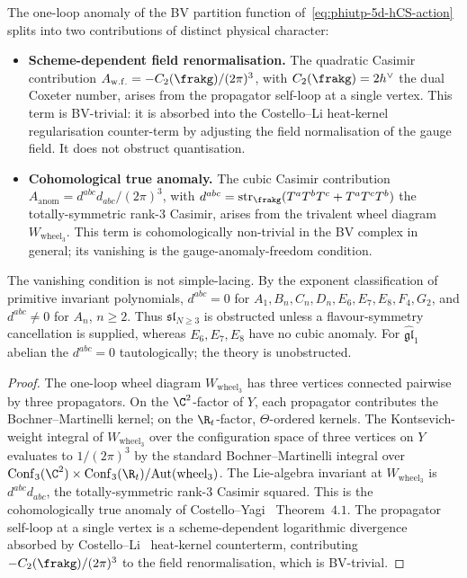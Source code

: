 \begin{proposition}
\label{prop:phiutp-one-loop-anomaly-split}
The one-loop anomaly of the BV partition function
of~\eqref{eq:phiutp-5d-hCS-action} splits into two contributions of
distinct physical character:
\begin{itemize}
 \item \textbf{Scheme-dependent field renormalisation.}
 The quadratic Casimir contribution
 $A_{\mathrm{w.f.}} = -C_2(\frakg)/(2\pi)^3$, with
 $C_2(\frakg) = 2h^\vee$ the dual Coxeter number, arises from
 the propagator self-loop at a single vertex. This term is
 BV-trivial: it is absorbed into the Costello--Li
 heat-kernel regularisation counter-term by adjusting the
 field normalisation of the gauge field. It does not obstruct
 quantisation.
 \item \textbf{Cohomological true anomaly.}
 The cubic Casimir contribution
 $A_{\mathrm{anom}} = d^{abc}d_{abc}/(2\pi)^3$, with
 $d^{abc} = \mathrm{str}_\frakg(T^a T^b T^c + T^a T^c T^b)$ the
 totally-symmetric rank-$3$ Casimir, arises from the trivalent
 wheel diagram $W_{\mathrm{wheel}_3}$. This term is
 cohomologically non-trivial in the BV complex in general; its
 vanishing is the gauge-anomaly-freedom condition.
\end{itemize}
The vanishing condition is not simple-lacing. By the exponent
classification of primitive invariant polynomials, $d^{abc}=0$ for
$A_1, B_n, C_n, D_n, E_6, E_7, E_8, F_4, G_2$, and $d^{abc}\neq0$ for
$A_n$, $n\geq2$. Thus $\mathfrak{sl}_{N\ge 3}$ is obstructed unless a
flavour-symmetry cancellation is supplied, whereas $E_6,E_7,E_8$ have
no cubic anomaly.
For $\widehat{\mathfrak{gl}}_1$ abelian the $d^{abc} = 0$ tautologically;
the theory is unobstructed.
\end{proposition}

\begin{proof}
The one-loop wheel diagram $W_{\mathrm{wheel}_3}$ has three vertices
connected pairwise by three propagators. On the
$\C^2$-factor of $Y$, each propagator contributes the Bochner--Martinelli
kernel; on the $\R_t$-factor, $\Theta$-ordered kernels. The
Kontsevich-weight integral of $W_{\mathrm{wheel}_3}$ over the
configuration space of three vertices on $Y$ evaluates to
$1/(2\pi)^3$ by the standard Bochner--Martinelli integral over
$\mathrm{Conf}_3(\C^2)\times \mathrm{Conf}_3(\R_t) /
\mathrm{Aut}(\mathrm{wheel}_3)$. The Lie-algebra invariant at
$W_{\mathrm{wheel}_3}$ is $d^{abc}d_{abc}$, the totally-symmetric
rank-$3$ Casimir squared. This is the cohomologically true anomaly
of Costello--Yagi~\cite{CostelloYagi2018} Theorem~$4.1$. The
propagator self-loop at a single vertex is a scheme-dependent
logarithmic divergence absorbed by Costello--Li~\cite{CostelloLi2016}
heat-kernel counterterm, contributing $-C_2(\frakg)/(2\pi)^3$ to the
field renormalisation, which is BV-trivial.
\end{proof}


